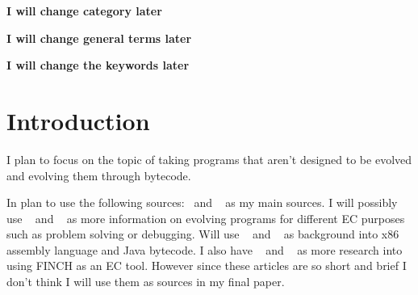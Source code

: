 \documentclass{sig-alternate}
\newcommand{\mycomment}[1]{{\bf #1}}
\begin{document}
\mycomment{I will change category later}

\terms{}
\mycomment{I will change general terms later}


\mycomment{I will change the keywords later}

\section{Introduction}
I plan to focus on the topic of taking programs that aren't designed to be evolved and evolving them through bytecode.  

In plan to use the following sources:~\cite{Assembly:2010} and ~\cite{FINCH:2010} as my main
sources. I will possibly use ~\cite{GISMOE:2012} and ~\cite{UCL:2012} as more information on evolving programs for different EC purposes such as problem solving or debugging. Will use ~\cite{x86:2014} and ~\cite{Oracle:2013} as background into x86 assembly language and Java bytecode. I also have ~\cite{NeuralNetworks:2013} and ~\cite{HeuristicLab:2013} as more research into using FINCH as an EC tool. However since these articles are so short and brief I don't think I will use them as sources in my final paper. 


\end{document}
